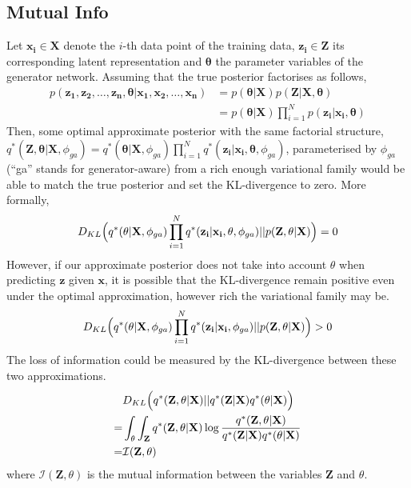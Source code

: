 \documentclass{article}
\begin{document}
\subsection{Mutual Info}
Let $\mathbf{x_i} \in \mathbf{X}$ denote the $i$-th data point of the training data, 
$\mathbf{z_i}\in \mathbf{Z}$ its corresponding latent representation and $\mathbf{\theta}$ the parameter variables
of the generator network. Assuming that the true posterior factorises as follows,
\begin{align}
p(\mathbf{z_1}, \mathbf{z_2}, \dots, \mathbf{z_n}, \mathbf{\theta} | \mathbf{x_1}, \mathbf{x_2}, \dots, \mathbf{x_n}) 
&= p(\mathbf{\theta} | \mathbf{X}) p(\mathbf{Z} |\mathbf{X}, \mathbf{\theta})\\
&= p(\mathbf{\theta} | \mathbf{X}) \prod_{i=1}^N p(\mathbf{z_i}|\mathbf{x_i}, \mathbf{\theta})
\end{align}
Then, some optimal approximate posterior with the same factorial structure, 
$q^*(\mathbf{Z}, \mathbf{\theta}|\mathbf{X}, \phi_{ga}) = q^*(\mathbf{\theta} | \mathbf{X}, \phi_{ga}) 
\prod_{i=1}^N q^*(\mathbf{z_i}|\mathbf{x_i}, \mathbf{\theta}, \phi_{ga})$, parameterised by $\phi_{ga}$
(``ga'' stands for generator-aware) from a rich enough variational family would be able to match the true posterior and set the 
KL-divergence to zero. More formally, 
\begin{align}
D_{KL}\Bigl(q^*(\mathbf{\theta} | \mathbf{X}, \phi_{ga}) 
\prod_{i=1}^N q^*(\mathbf{z_i}|\mathbf{x_i}, \mathbf{\theta}, \phi_{ga}) || p(\mathbf{Z}, \theta| \mathbf{X})\Bigr) = 0
\end{align}
However, if our approximate posterior does not take into account $\theta$ when predicting $\mathbf{z}$
given $\mathbf{x}$, it is possible that the KL-divergence remain positive even under the optimal approximation, 
however rich the variational family may be.
\begin{align}
D_{KL}\Bigl(q^*(\mathbf{\theta} | \mathbf{X}, \phi_{ga}) 
\prod_{i=1}^N q^*(\mathbf{z_i}|\mathbf{x_i}, \phi_{ga}) || p(\mathbf{Z}, \theta| \mathbf{X})\Bigr) > 0
\end{align}
The loss of information could be measured by the KL-divergence between these two approximations. 
\begin{align}
&D_{KL}\Bigl(q^*(\mathbf{Z}, \theta |\mathbf{X}) || 
q^*(\mathbf{Z}|\mathbf{X}) q^*(\mathbf{\theta} | \mathbf{X}) \Bigr) \\
=&\int_{\theta} \int_{\mathbf{Z}} q^*(\mathbf{Z}, \theta |\mathbf{X}) \log \frac{q^*(\mathbf{Z}, \theta |\mathbf{X})} 
{q^*(\mathbf{Z}|\mathbf{X}) q^*(\mathbf{\theta} | \mathbf{X})} \\
=& \mathcal{I} (\mathbf{Z}, \theta)
\end{align}
where $\mathcal{I} (\mathbf{Z}, \theta)$ is the mutual information between the variables $\mathbf{Z}$ and $\theta$.
\end{document}
